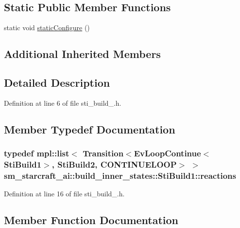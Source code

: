 \subsection*{Static Public Member Functions}
\begin{DoxyCompactItemize}
\item 
static void \hyperlink{structsm__starcraft__ai_1_1build__inner__states_1_1StiBuild1_a7450c65f49b3622ca6b2075b854c0c0f}{static\+Configure} ()
\end{DoxyCompactItemize}
\subsection*{Additional Inherited Members}


\subsection{Detailed Description}


Definition at line 6 of file sti\+\_\+build\+\_.\+h.



\subsection{Member Typedef Documentation}
\subsubsection[{\texorpdfstring{reactions}{reactions}}]{\setlength{\rightskip}{0pt plus 5cm}typedef mpl\+::list$<$ Transition$<$Ev\+Loop\+Continue$<${\bf Sti\+Build1}$>$, {\bf Sti\+Build2}, C\+O\+N\+T\+I\+N\+U\+E\+L\+O\+OP$>$ $>$ {\bf sm\+\_\+starcraft\+\_\+ai\+::build\+\_\+inner\+\_\+states\+::\+Sti\+Build1\+::reactions}}\hypertarget{structsm__starcraft__ai_1_1build__inner__states_1_1StiBuild1_aabf9de8b9a975d7b8c3ac5ec150706a7}{}\label{structsm__starcraft__ai_1_1build__inner__states_1_1StiBuild1_aabf9de8b9a975d7b8c3ac5ec150706a7}


Definition at line 16 of file sti\+\_\+build\+\_.\+h.



\subsection{Member Function Documentation}
